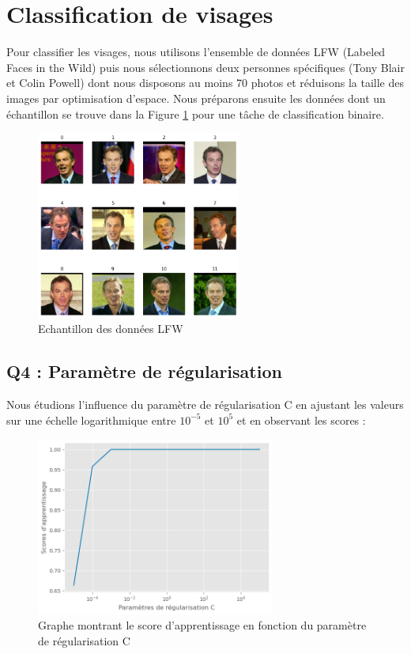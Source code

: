 \documentclass{scrartcl}
\begin{document}
\section{Classification de visages}

\hspace{7pt} Pour classifier les visages, nous utilisons l'ensemble de données LFW (Labeled Faces in the Wild) puis nous sélectionnons deux personnes spécifiques (Tony Blair et Colin Powell) dont nous disposons au moins 70 photos et réduisons la taille des images par optimisation d'espace. Nous préparons ensuite les données dont un échantillon se trouve dans la Figure \ref{fig:lfw} pour une tâche de classification binaire.

\begin{figure}[h!]
    \centering
    \includegraphics[width=0.6\textwidth]{../images/TB-CP.png}
    \caption{\centering Echantillon des données LFW} 
    \label{fig:lfw}
\end{figure}

\subsection{Q4 : Paramètre de régularisation}

\hspace{7pt} Nous étudions l'influence du paramètre de régularisation C en ajustant les valeurs sur une échelle logarithmique entre $10^{-5}$ et $10^5$ et en observant les scores :

\begin{figure}[h!]
    \centering
    \includegraphics[width=0.7\textwidth]{../images/classification.png}
    \caption{\centering Graphe montrant le score d'apprentissage en fonction du paramètre de régularisation C} 
    \label{fig:score}
\end{figure}
\end{document}
